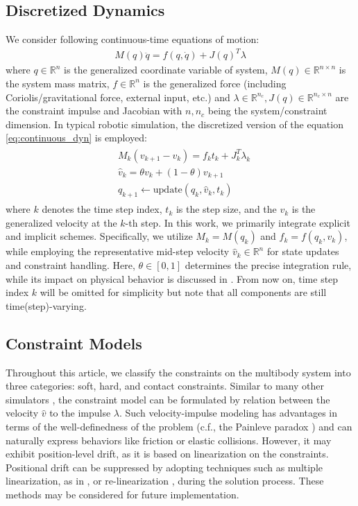 \documentclass[lettersize,journal]{IEEEtran}
\begin{document}
\subsection{Discretized Dynamics}
We consider following continuous-time equations of motion:
\begin{align} \label{eq:continuous_dyn}
    M(q)\ddot{q} = f(q,\dot{q}) + J(q)^T\lambda
\end{align}
where $q\in\mathbb{R}^n$ is the generalized coordinate variable of system, $M(q)\in\mathbb{R}^{n\times n}$ is the system mass matrix, $f\in\mathbb{R}^n$ is the generalized force (including Coriolis/gravitational force, external input, etc.) and $\lambda\in\mathbb{R}^{n_c}, J(q)\in\mathbb{R}^{n_c\times n}$ are the constraint impulse and Jacobian with $n,n_c$ being the system/constraint dimension.
In typical robotic simulation, the discretized version of the equation \eqref{eq:continuous_dyn} is employed:
\begin{align} \label{eq:discrete_dyn}
\begin{split}
    &M_k(v_{k+1}-v_k) = f_k t_k+ J_{k}^T\lambda_{k} \\
    &\hat{v}_k=\theta v_k+ (1-\theta)v_{k+1} \\
    &q_{k+1} \leftarrow \text{update}(q_k, \hat{v}_k, t_k)
\end{split}
\end{align}
where $k$ denotes the time step index, $t_k$ is the step size, and the $v_k$ is the generalized velocity at the $k$-th step. 
In this work, we primarily integrate explicit and implicit schemes. Specifically, we utilize $M_k = M(q_k)$ and $f_k = f(q_k, v_k)$, while employing the representative mid-step velocity $\hat{v}_k \in \mathbb{R}^n$ for state updates and constraint handling.
Here, $\theta \in [0, 1]$ determines the precise integration rule, while its impact on physical behavior is discussed in \cite{kim2017haptic}.
From now on, time step index $k$ will be omitted for simplicity but note that all components are still time(step)-varying.

\subsection{Constraint Models}

Throughout this article, we classify the constraints on the multibody system into three categories: soft, hard, and contact constraints.
Similar to many other simulators \cite{RaiSim, bullet, mujoco}, the constraint model can be formulated by relation between the velocity $\hat{v}$ to the impulse $\lambda$.
Such velocity-impulse modeling has advantages in terms of the well-definedness of the problem (c.f., the Painleve paradox \cite{acary2011formulation}) and can naturally express behaviors like friction or elastic collisions. However, it may exhibit position-level drift, as it is based on linearization on the constraints.
Positional drift can be suppressed by adopting techniques such as multiple linearization, as in \cite{daviet2020simple}, or re-linearization \cite{verschoor2019efficient}, during the solution process. These methods may be considered for future implementation.
\end{document}
